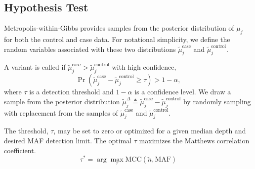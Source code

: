 \documentclass[11pt,reqno]{amsart}
\begin{document}
\subsection{Hypothesis Test}\label{sec:hypothesis_test}
Metropolis-within-Gibbs provides samples from the posterior distribution of $\mu_j$ for both the control and case data. For notational simplicity, we define the random variables associated with these two distributions $\tilde{\mu}_j^{\text{case}}$ and $\tilde{\mu}_j^{\text{control}}$.

A variant is called if $\tilde{\mu}_j^{\text{case}} > \tilde{\mu}_j^{\text{control}}$ with high confidence,
\begin{equation}
	\Pr( \tilde{\mu}_j^{\text{case}} - \tilde{\mu}_j^{\text{control}} \geq \tau ) > 1-\alpha,
\end{equation}
where $\tau$ is a detection threshold and $1-\alpha$ is a confidence level. We draw a sample from the posterior distribution $\tilde{\mu}_j^{\Delta} \triangleq \tilde{\mu}_j^{\text{case}} - \tilde{\mu}_j^{\text{control}}$ by randomly sampling with replacement from the samples of $\tilde{\mu}_j^{\text{case}}$ and $\tilde{\mu}_j^{\text{control}}$.

The threshold, $\tau$, may be set to zero or optimized for a given median depth and desired MAF detection limit. The optimal $\tau$ maximizes the Matthews correlation coefficient.
\begin{equation}
	\tau^* = \arg\max_\tau \text{MCC}(\tilde{n}, \text{MAF})
\end{equation}



\end{document}
